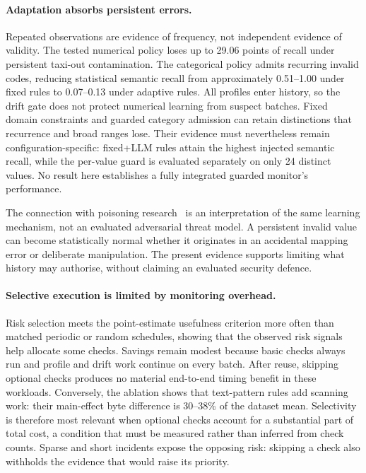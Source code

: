 \paragraph{Adaptation absorbs persistent errors.} Repeated observations are evidence of frequency, not independent evidence of validity. The tested numerical policy loses up to 29.06 points of recall under persistent taxi-out contamination. The categorical policy admits recurring invalid codes, reducing statistical semantic recall from approximately 0.51--1.00 under fixed rules to 0.07--0.13 under adaptive rules. All profiles enter history, so the drift gate does not protect numerical learning from suspect batches. Fixed domain constraints and guarded category admission can retain distinctions that recurrence and broad ranges lose. Their evidence must nevertheless remain configuration-specific: fixed+LLM rules attain the highest injected semantic recall, while the per-value guard is evaluated separately on only 24 distinct values. No result here establishes a fully integrated guarded monitor's performance.

The connection with poisoning research~\cite{Biggio2012,Steinhardt2017} is an interpretation of the same learning mechanism, not an evaluated adversarial threat model. A persistent invalid value can become statistically normal whether it originates in an accidental mapping error or deliberate manipulation. The present evidence supports limiting what history may authorise, without claiming an evaluated security defence.

\paragraph{Selective execution is limited by monitoring overhead.} Risk selection meets the point-estimate usefulness criterion more often than matched periodic or random schedules, showing that the observed risk signals help allocate some checks. Savings remain modest because basic checks always run and profile and drift work continue on every batch. After reuse, skipping optional checks produces no material end-to-end timing benefit in these workloads. Conversely, the ablation shows that text-pattern rules add scanning work: their main-effect byte difference is 30--38\% of the dataset mean. Selectivity is therefore most relevant when optional checks account for a substantial part of total cost, a condition that must be measured rather than inferred from check counts. Sparse and short incidents expose the opposing risk: skipping a check also withholds the evidence that would raise its priority.

